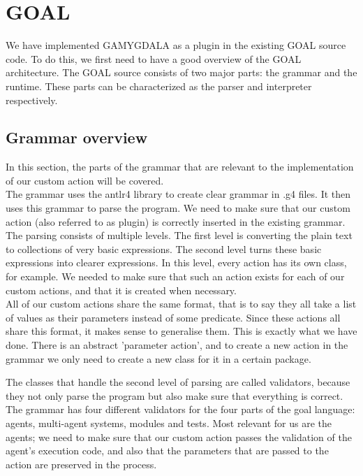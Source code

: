 \section{GOAL}
We have implemented GAMYGDALA as a plugin in the existing GOAL source code. To do this, we first need to have a good overview of the GOAL architecture.
The GOAL source consists of two major parts: the grammar and the runtime. These parts can be characterized as the parser and interpreter respectively.

\subsection{Grammar overview}
In this section, the parts of the grammar that are relevant to the implementation of our custom action will be covered. \\ 

The grammar uses the antlr4 library to create clear grammar in .g4 files. It then uses this grammar to parse the program. We need to make sure that our custom action (also referred to as plugin) is correctly inserted in the existing grammar. \\ 

The parsing consists of multiple levels. The first level is converting the plain text to collections of very basic expressions. The second level turns these basic expressions into clearer expressions. In this level, every action has its own class, for example. We needed to make sure that such an action exists for each of our custom actions, and that it is created when necessary. \\

All of our custom actions share the same format, that is to say they all take a list of values as their parameters instead of some predicate. Since these actions all share this format, it makes sense to generalise them. This is exactly what we have done. There is an abstract 'parameter action', and to create a new action in the grammar we only need to create a new class for it in a certain package. 

The classes that handle the second level of parsing are called validators, because they not only parse the program but also make sure that everything is correct. The grammar has four different validators for the four parts of the goal language: agents, multi-agent systems, modules and tests. Most relevant for us are the agents; we need to make sure that our custom action passes the validation of the agent's execution code, and also that the parameters that are passed to the action are preserved in the process. \\ 

